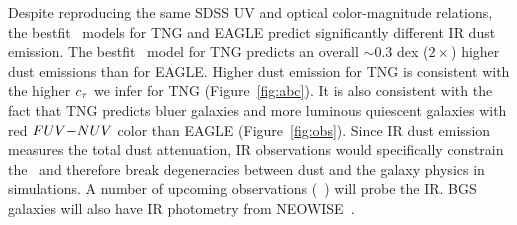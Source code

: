 Despite reproducing the same SDSS UV and optical color-magnitude relations, the
bestfit \eda~models for TNG and EAGLE predict significantly different IR dust
emission. The bestfit \eda~model for TNG predicts an overall ${\sim}0.3$ dex
($2\times$) higher dust emissions than for EAGLE. Higher dust emission for TNG
is consistent with the higher $c_\tau$ we infer for TNG (Figure~\ref{fig:abc}).
It is also consistent with the fact that TNG predicts bluer galaxies and more
luminous quiescent galaxies with red $FUV{-}NUV$ color than EAGLE
(Figure~\ref{fig:obs}). Since IR dust emission measures the total dust
attenuation, IR observations would specifically constrain the \eda~and
therefore break degeneracies between dust and the galaxy physics in simulations.
A number of upcoming observations (\eg~) will probe the IR. BGS galaxies will also have IR photometry from
NEOWISE~\citep{meisner2018}. 




